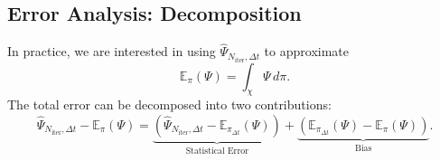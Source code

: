 \documentclass[11pt, twoside]{report}
\newtheorem{theorem}{Theorem}[section]
\begin{document}

\subsection{Error Analysis: Decomposition}

In practice, we are interested in using $\widehat{\Psi}_{N_{\text{iter}},\Delta t}$ to approximate
\[
\mathbb{E}_\pi(\Psi) = \int_\chi \Psi \, d\pi.
\]
The total error can be decomposed into two contributions:
\begin{equation} \label{eq:statistic_bias}
    \widehat{\Psi}_{N_{\text{iter}},\Delta t} - \mathbb{E}_\pi(\Psi) = \underbrace{\left( \widehat{\Psi}_{N_{\text{iter}},\Delta t} - \mathbb{E}_{\pi_{\Delta t}}(\Psi) \right)}_{\text{Statistical Error}} + \underbrace{\left( \mathbb{E}_{\pi_{\Delta t}}(\Psi) - \mathbb{E}_\pi(\Psi) \right)}_{\text{Bias}}.
\end{equation}
\end{document}

